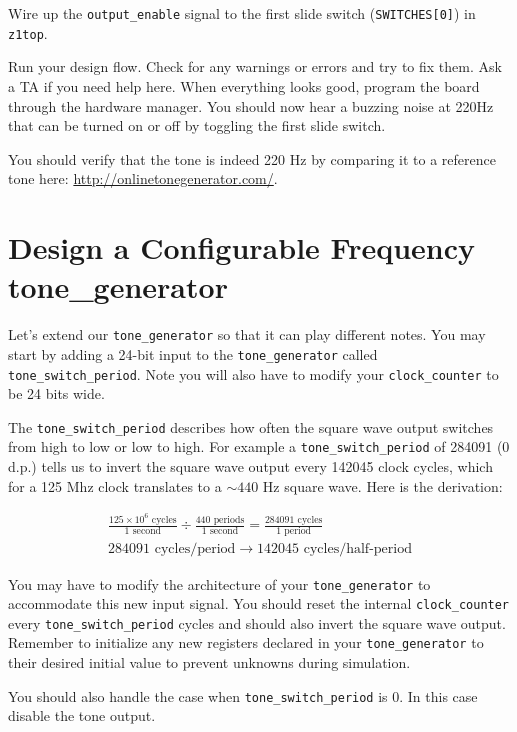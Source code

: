 \documentclass[11pt]{article}
\begin{document}
Wire up the \verb|output_enable| signal to the first slide switch (\verb|SWITCHES[0]|) in \verb|z1top|.

Run your design flow. Check for any warnings or errors and try to fix them. Ask a TA if you need help here. When everything looks good, program the board through the hardware manager. You should now hear a buzzing noise at 220Hz that can be turned on or off by toggling the first slide switch.

You should verify that the tone is indeed 220 Hz by comparing it to a reference tone here: \url{http://onlinetonegenerator.com/}.

\section{Design a Configurable Frequency tone\_generator}

Let's extend our \verb|tone_generator| so that it can play different notes. You may start by adding a 24-bit input to the \verb|tone_generator| called \verb|tone_switch_period|. Note you will also have to modify your \verb|clock_counter| to be 24 bits wide.

The \verb|tone_switch_period| describes how often the square wave output switches from high to low or low to high. For example a \verb|tone_switch_period| of 284091 (0 d.p.) tells us to invert the square wave output every 142045 clock cycles, which for a 125 Mhz clock translates to a $\sim 440$ Hz square wave. Here is the derivation:

\begin{eqnarray}
  \frac{125 \times 10^6 \text{ cycles}}{1 \text{ second}} \div \frac{440 \text{ periods}}{1 \text{ second}} = \frac{ 284091 \text{ cycles}}{1 \text{ period}} \nonumber \\
  284091 \text{ cycles/period} \rightarrow 142045 \text{ cycles/half-period} \nonumber
\end{eqnarray}

You may have to modify the architecture of your \verb|tone_generator| to accommodate this new input signal. You should reset the internal \verb|clock_counter| every \verb|tone_switch_period| cycles and should also invert the square wave output. Remember to initialize any new registers declared in your \verb|tone_generator| to their desired initial value to prevent unknowns during simulation.

You should also handle the case when \verb|tone_switch_period| is 0.  In this case disable the tone output.
\end{document}
